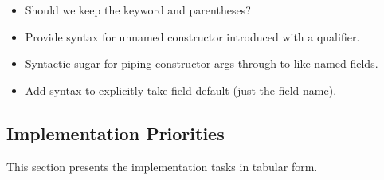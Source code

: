 \begin{itemize}[itemsep=0pt]
\item Should we keep the  keyword and parentheses?
\item Provide syntax for unnamed constructor introduced with a qualifier.
\item Syntactic sugar for piping constructor args through to like-named fields.
\item Add syntax to explicitly take field default (just the field name).
\end{itemize}


\newpage
\subsection{Implementation Priorities}
This section presents the implementation tasks in tabular form.

